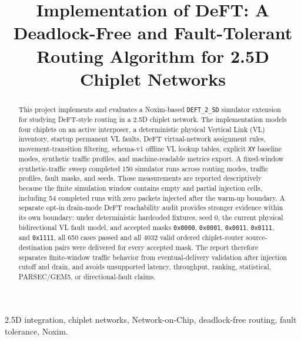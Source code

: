 \documentclass[conference]{IEEEtran}
\begin{document}
\title{Implementation of DeFT: A Deadlock-Free and Fault-Tolerant Routing Algorithm for 2.5D Chiplet Networks}

\author{
}

\maketitle

\begin{abstract}
This project implements and evaluates a Noxim-based \texttt{DEFT\_2\_5D} simulator extension for studying DeFT-style routing in a 2.5D chiplet network. The implementation models four chiplets on an active interposer, a deterministic physical Vertical Link (VL) inventory, startup permanent VL faults, DeFT virtual-network assignment rules, movement-transition filtering, schema-v1 offline VL lookup tables, explicit \texttt{XY} baseline modes, synthetic traffic profiles, and machine-readable metrics export. A fixed-window synthetic-traffic sweep completed 150 simulator runs across routing modes, traffic profiles, fault masks, and seeds. Those measurements are reported descriptively because the finite simulation window contains empty and partial injection cells, including 54 completed runs with zero packets injected after the warm-up boundary. A separate opt-in drain-mode DeFT reachability audit provides stronger evidence within its own boundary: under deterministic hardcoded fixtures, seed 0, the current physical bidirectional VL fault model, and accepted masks \texttt{0x0000}, \texttt{0x0001}, \texttt{0x0011}, \texttt{0x0111}, and \texttt{0x1111}, all 650 cases passed and all 4032 valid ordered chiplet-router source-destination pairs were delivered for every accepted mask. The report therefore separates finite-window traffic behavior from eventual-delivery validation after injection cutoff and drain, and avoids unsupported latency, throughput, ranking, statistical, PARSEC/GEM5, or directional-fault claims.
\end{abstract}

\begin{IEEEkeywords}
2.5D integration, chiplet networks, Network-on-Chip, deadlock-free routing, fault tolerance, Noxim.
\end{IEEEkeywords}
\end{document}

